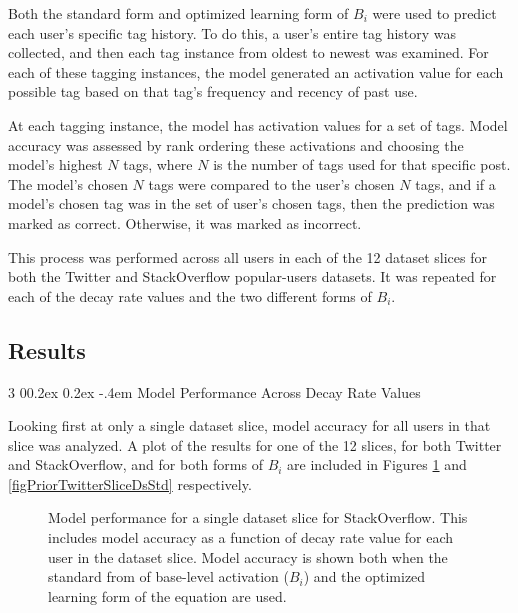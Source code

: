 \documentclass[man,donotrepeattitle]{apa6}
\makeatletter
\renewcommand{\subsubsection}{%
  \@startsection
  {subsubsection}%
  {3}%
  {\parindent}%
  {0\baselineskip \@plus 0.2ex \@minus 0.2ex}%
  {-.4em}%
  {\normalfont\normalsize\bfseries\addperi}}
\makeatother
\begin{document}
Both the standard form and optimized learning form of $B_{i}$ were used to predict each user's specific tag history.
To do this, a user's entire tag history was collected, and then each tag instance from oldest to newest was examined.
For each of these tagging instances, the model generated an activation value for each possible tag based on that tag's frequency and recency of past use. 

At each tagging instance, the model has activation values for a set of tags.
Model accuracy was assessed by rank ordering these activations and choosing the model's highest $N$ tags, where $N$ is the number of tags used for that specific post.
The model's chosen $N$ tags were compared to the user's chosen $N$ tags, and if a model's chosen tag was in the set of user's chosen tags, then the prediction was marked as correct.
Otherwise, it was marked as incorrect.

This process was performed across all users in each of the 12 dataset slices for both the Twitter and StackOverflow popular-users datasets.
It was repeated for each of the decay rate values and the two different forms of $B_{i}$.

\subsection{Results}

\subsubsection{Model Performance Across Decay Rate Values}

Looking first at only a single dataset slice, model accuracy for all users in that slice was analyzed.
A plot of the results for one of the 12 slices, for both Twitter and StackOverflow, and for both forms of $B_{i}$ are included in Figures \ref{figPriorSOQSliceDsStd} and \ref{figPriorTwitterSliceDsStd} respectively.

\begin{figure}[!htbp]
  {%
    \setlength{\fboxsep}{0pt}%
    \setlength{\fboxrule}{1pt}%
    \hfill
    \hfill
    \caption{
    Model performance for a single dataset slice for StackOverflow.
    This includes model accuracy as a function of decay rate value for each user in the dataset slice.
    Model accuracy is shown both when the standard from of base-level activation ($B_{i}$) and the optimized learning form of the equation are used. 
  }
    \label{figPriorSOQSliceDsStd}
  }%

\end{figure}
\end{document}
